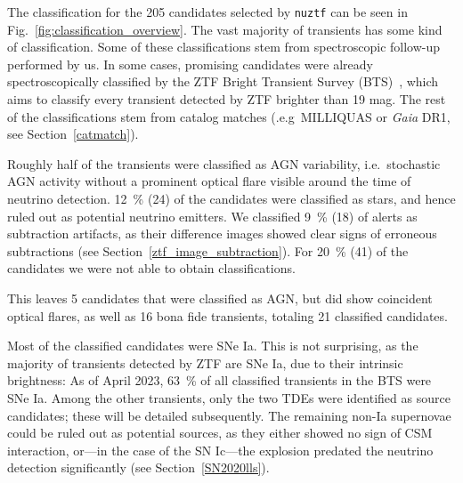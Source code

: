 The classification for the 205 candidates selected by \texttt{nuztf} can be seen in Fig.~\ref{fig:classification_overview}. The vast majority of transients has some kind of classification. Some of these classifications stem from spectroscopic follow-up performed by us. In some cases, promising candidates were already spectroscopically classified by the ZTF Bright Transient Survey (BTS)~, which aims to classify every transient detected by ZTF brighter than 19 mag. The rest of the classifications stem from catalog matches (.e.g\ MILLIQUAS or \textit{Gaia} DR1, see Section~\ref{catmatch}).

Roughly half of the transients were classified as AGN variability, i.e.\ stochastic AGN activity without a prominent optical flare visible around the time of neutrino detection. \SI{12}{\percent} (24) of the candidates were classified as stars, and hence ruled out as potential neutrino emitters. We classified \SI{9}{\percent} (18) of alerts as subtraction artifacts, as their difference images showed clear signs of erroneous subtractions (see Section~\ref{ztf_image_subtraction}). For \SI{20}{\percent} (41) of the candidates we were not able to obtain classifications.

This leaves 5 candidates that were classified as AGN, but did show coincident optical flares, as well as 16 bona fide transients, totaling 21 classified candidates.

Most of the classified candidates were SNe Ia. This is not surprising, as the majority of transients detected by ZTF are SNe Ia, due to their intrinsic brightness: As of April 2023, \SI{63}{\percent} of all classified transients in the BTS were SNe Ia. Among the other transients, only the two TDEs were identified as source candidates; these will be detailed subsequently. The remaining non-Ia supernovae could be ruled out as potential sources, as they either showed no sign of CSM interaction, or---in the case of the SN Ic---the explosion predated the neutrino detection significantly (see Section~\ref{SN2020lls}).


